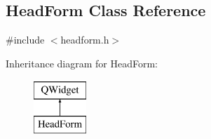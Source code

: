 \hypertarget{classHeadForm}{}\subsection{Head\+Form Class Reference}
\label{classHeadForm}


{\ttfamily \#include $<$headform.\+h$>$}

Inheritance diagram for Head\+Form\+:\begin{figure}[H]
\begin{center}
\leavevmode
\includegraphics[height=2.000000cm]{classHeadForm}
\end{center}
\end{figure}
